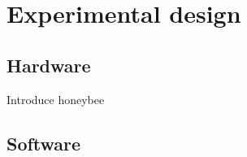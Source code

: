 \graphicspath{{exp_design/fig/}}

\chapter{Experimental design}
\label{chap:exp_design}

    \section{Hardware}

    Introduce honeybee
    
    \section{Software}


